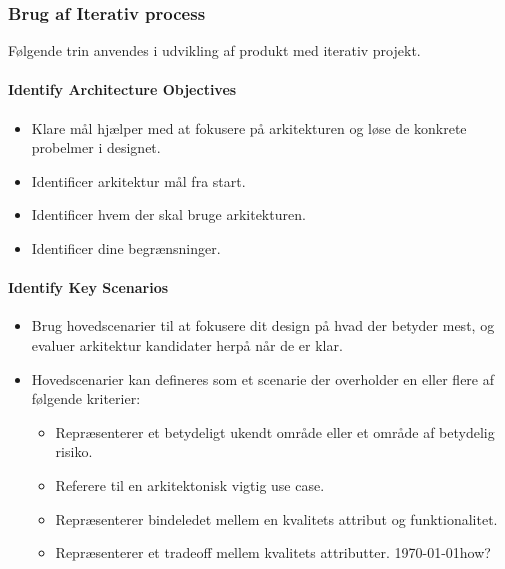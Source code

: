 \subsubsection{Brug af Iterativ process}\label{sec:arc_ite}
Følgende trin anvendes i udvikling af produkt med iterativ projekt.

\paragraph{Identify Architecture Objectives}
\begin{itemize}
	\item Klare mål hjælper med at fokusere på arkitekturen og løse de konkrete probelmer i designet.
	\item Identificer arkitektur mål fra start.
	\item Identificer hvem der skal bruge arkitekturen.
	\item Identificer dine begrænsninger.
\end{itemize}

\paragraph{Identify Key Scenarios}
\begin{itemize}
	\item Brug hovedscenarier til at fokusere dit design på hvad der betyder mest, og evaluer arkitektur kandidater herpå når de er klar.
	\item Hovedscenarier kan defineres som et scenarie der overholder en eller flere af følgende kriterier:
	\begin{itemize}
		\item Repræsenterer et betydeligt ukendt område eller et område af betydelig risiko.
		\item Referere til en arkitektonisk vigtig use case.
		\item Repræsenterer bindeledet mellem en kvalitets attribut og funktionalitet.
		\item Repræsenterer et tradeoff mellem kvalitets attributter. \today{how?}
	\end{itemize}
\end{itemize}


